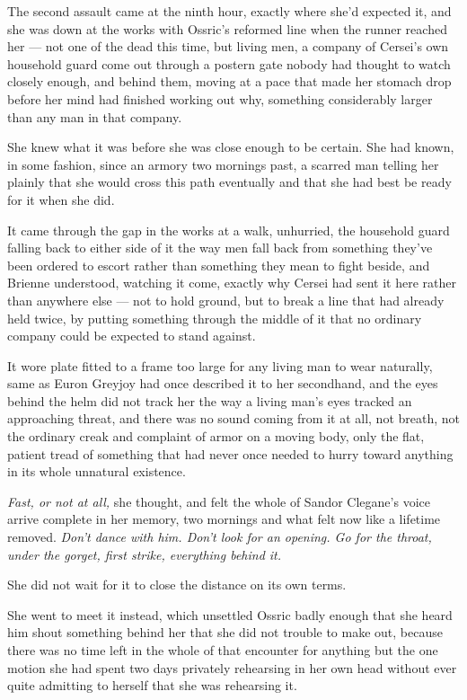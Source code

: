 The second assault came at the ninth hour, exactly where she’d expected it, and she was down at the works with Ossric’s reformed line when the runner reached her — not one of the dead this time, but living men, a company of Cersei’s own household guard come out through a postern gate nobody had thought to watch closely enough, and behind them, moving at a pace that made her stomach drop before her mind had finished working out why, something considerably larger than any man in that company.

She knew what it was before she was close enough to be certain. She had known, in some fashion, since an armory two mornings past, a scarred man telling her plainly that she would cross this path eventually and that she had best be ready for it when she did.

\sceneBreak

It came through the gap in the works at a walk, unhurried, the household guard falling back to either side of it the way men fall back from something they’ve been ordered to escort rather than something they mean to fight beside, and Brienne understood, watching it come, exactly why Cersei had sent it here rather than anywhere else — not to hold ground, but to break a line that had already held twice, by putting something through the middle of it that no ordinary company could be expected to stand against.

It wore plate fitted to a frame too large for any living man to wear naturally, same as Euron Greyjoy had once described it to her secondhand, and the eyes behind the helm did not track her the way a living man’s eyes tracked an approaching threat, and there was no sound coming from it at all, not breath, not the ordinary creak and complaint of armor on a moving body, only the flat, patient tread of something that had never once needed to hurry toward anything in its whole unnatural existence.

\textit{Fast, or not at all,} she thought, and felt the whole of Sandor Clegane’s voice arrive complete in her memory, two mornings and what felt now like a lifetime removed. \textit{Don’t dance with him. Don’t look for an opening. Go for the throat, under the gorget, first strike, everything behind it.}

\sceneBreak

She did not wait for it to close the distance on its own terms.

She went to meet it instead, which unsettled Ossric badly enough that she heard him shout something behind her that she did not trouble to make out, because there was no time left in the whole of that encounter for anything but the one motion she had spent two days privately rehearsing in her own head without ever quite admitting to herself that she was rehearsing it.

